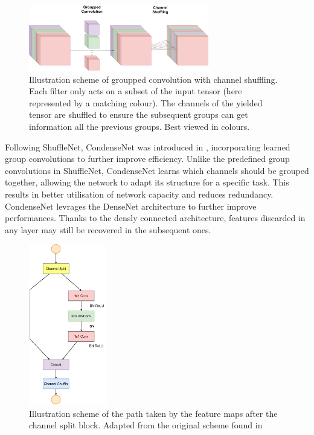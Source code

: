 \begin{figure}[htbp]
    \centering
    \includegraphics[width=0.70\textwidth]{chapter_sota/assets/group_conv_and_channel_shuffling.pdf}
    \caption{Illustration scheme of groupped convolution with channel shuffling.
    Each filter only acts on a subset of the input tensor (here represented by a
    matching colour). The channels of the yielded tensor are shuffled to ensure
    the subsequent groups can get information all the previous groups. Best
    viewed in colours.}
    \label{fig:sota:shuffle_net}
\end{figure}

Following ShuffleNet, CondenseNet was introduced in
\cite{huang2018condensenet}, incorporating learned group convolutions to further
improve efficiency. Unlike the predefined group convolutions in ShuffleNet,
CondenseNet learns which channels should be grouped together, allowing the
network to adapt its structure for a specific task. This results in better
utilisation of network capacity and reduces redundancy. CondenseNet levrages the
DenseNet architecture \cite{huang2017densely} to further improve performances.
Thanks to the densly connected architecture, features discarded in any layer may
still be recovered in the subsequent ones.\\

\begin{figure}[!h]
    \centering
    \includegraphics[width=0.3\textwidth]{chapter_sota/assets/channel_split.pdf}
    \caption{Illustration scheme of the path taken by the feature maps after the
    channel split block. Adapted from the original scheme found in \cite{MaShuffleNetV2}}
    \label{fig:sota:channel_split}
\end{figure}

